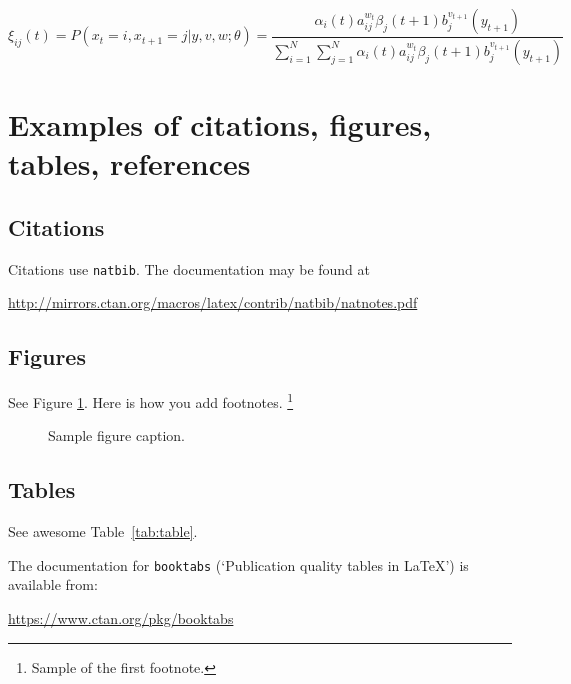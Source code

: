 \documentclass{article}
\begin{document}
\begin{equation}
	\xi _{ij}(t)=P(x_{t}=i,x_{t+1}=j|y,v,w;\theta)= {\frac {\alpha _{i}(t)a^{w_t}_{ij}\beta _{j}(t+1)b^{v_{t+1}}_{j}(y_{t+1})}{\sum _{i=1}^{N} \sum _{j=1}^{N} \alpha _{i}(t)a^{w_t}_{ij}\beta _{j}(t+1)b^{v_{t+1}}_{j}(y_{t+1})}}
\end{equation}


\section{Examples of citations, figures, tables, references}
\label{sec:others}

\subsection{Citations}
Citations use \verb+natbib+. The documentation may be found at
\begin{center}
	\url{http://mirrors.ctan.org/macros/latex/contrib/natbib/natnotes.pdf}
\end{center}


\subsection{Figures}

See Figure \ref{fig:fig1}. Here is how you add footnotes. \footnote{Sample of the first footnote.}


\begin{figure}
	\centering
	\fbox{\rule[-.5cm]{4cm}{4cm} \rule[-.5cm]{4cm}{0cm}}
	\caption{Sample figure caption.}
	\label{fig:fig1}
\end{figure}

\subsection{Tables}
See awesome Table~\ref{tab:table}.

The documentation for \verb+booktabs+ (`Publication quality tables in LaTeX') is available from:
\begin{center}
	\url{https://www.ctan.org/pkg/booktabs}
\end{center}
\end{document}
